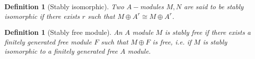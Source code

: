 \documentclass[12pt]{report}
\numberwithin{equation}{section}
\newcounter{dummy} \numberwithin{dummy}{section}
\newtheorem{definition}[dummy]{Definition}
\begin{document}
	\begin{definition}[Stably isomorphic]\label{stabiso}
		Two $A-$modules $M,N$ are said to be stably isomorphic if there exists $r$ such that $M \oplus A^r \cong M \oplus A^r$.
	\end{definition}
	\begin{definition}[Stably free module]\label{stabfree}
		An $A$ module $M$ is stably free if there exists a finitely generated free module $F$ such that $M \oplus F$ is free, i.e. if $M$ is stably isomorphic to a finitely generated free $A$ module.
	\end{definition}
	
	
\end{document}
